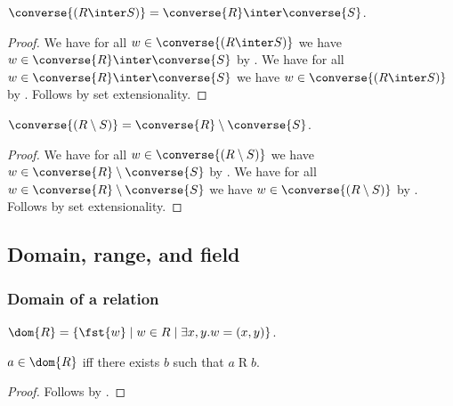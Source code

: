 \begin{proposition}\label{converse_inter}
    $\converse{(R\inter S)} = \converse{R}\inter\converse{S}$.
\end{proposition}
\begin{proof}
    We have for all $w\in\converse{(R\inter S)}$
        we have $w\in\converse{R}\inter\converse{S}$
        by .
    We have for all $w\in\converse{R}\inter\converse{S}$
        we have $w\in\converse{(R\inter S)}$
        by .
    Follows by set extensionality.
\end{proof}

\begin{proposition}\label{converse_setminus}
    $\converse{(R\setminus S)} = \converse{R}\setminus\converse{S}$.
\end{proposition}
\begin{proof}
    We have for all $w\in\converse{(R\setminus S)}$
        we have $w\in\converse{R}\setminus\converse{S}$
        by .
    We have for all $w\in\converse{R}\setminus\converse{S}$
        we have $w\in\converse{(R\setminus S)}$
        by .
    Follows by set extensionality.
\end{proof}



\subsection{Domain, range, and field}

\subsubsection{Domain of a relation}

\begin{definition}\label{dom}
    $\dom{R} = \{ \fst{w}\mid w\in R\mid \exists x, y. w = (x, y)\}$.
\end{definition}

\begin{proposition}\label{dom_iff}
    $a\in\dom{R}$ iff there exists $b$ such that $a\mathrel{R} b$.
\end{proposition}
\begin{proof}
    Follows by .
\end{proof}

